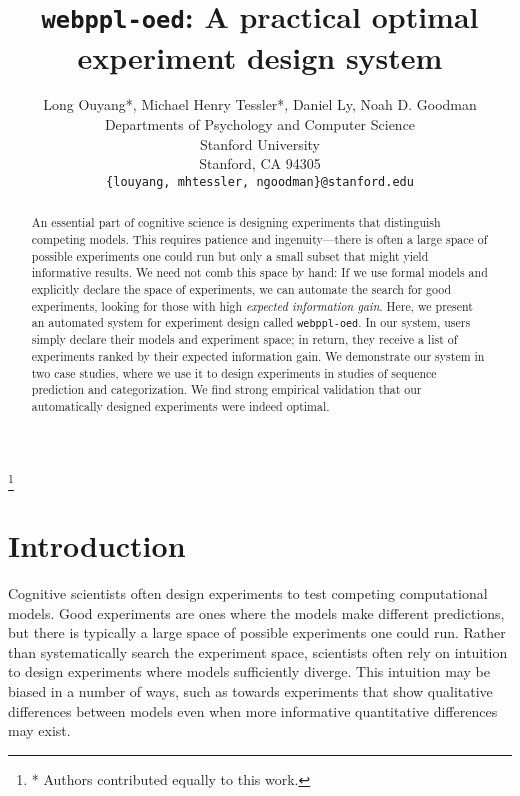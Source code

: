 \documentclass[10pt,letterpaper]{article}
\title{\texttt{webppl-oed}: A practical optimal experiment design system}
\author{
  Long Ouyang*, Michael Henry Tessler*, Daniel Ly, Noah D. Goodman\\
  Departments of Psychology and Computer Science\\
  Stanford University\\
  Stanford, CA 94305 \\
  \texttt{\{louyang, mhtessler, ngoodman\}@stanford.edu}\\
}
\newcommand{\ndg}[1]{\textcolor{Green}{[ndg: #1]}}
\newcommand{\mht}[1]{\textcolor{Blue}{[mht: #1]}}
\newcommand{\lou}[1]{\textcolor{orange}{[lou: #1]}}
\newcommand\blfootnote[1]{%
  \begingroup
  \renewcommand\thefootnote{}\footnote{#1}%
  \addtocounter{footnote}{-1}%
  \endgroup
}
\begin{document}
\maketitle

\begin{abstract}

An essential part of cognitive science is designing experiments that distinguish competing models.
This requires patience and ingenuity---there is often a large space of possible experiments one could run but only a small subset that might yield informative results.
We need not comb this space by hand: If we use formal models and explicitly declare the space of experiments, we can automate the search for good experiments, looking for those with high \emph{expected information gain}.
Here, we present an automated system for experiment design called \texttt{webppl-oed}.
In our system, users simply declare their models and experiment space; in return, they receive a list of experiments ranked by their expected information gain.
We demonstrate our system in two case studies, where we use it to design experiments in studies of sequence prediction and categorization.
We find strong empirical validation that our automatically designed experiments were indeed optimal.


\end{abstract}

\blfootnote{* Authors contributed equally to this work.}

\section{Introduction}
Cognitive scientists often design experiments to test competing computational models.
Good experiments are ones where the models make different predictions, but there is typically a large space of possible experiments one could run.
Rather than systematically search the experiment space, scientists often rely on intuition to design experiments where models sufficiently diverge.
This intuition may be biased in a number of ways, such as towards experiments that show qualitative differences between models even when more informative quantitative differences may exist.
\end{document}
